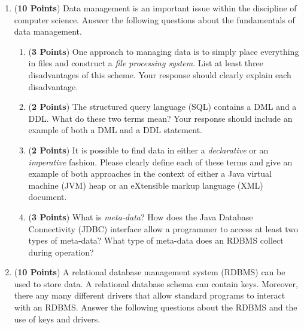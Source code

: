\documentclass[12pt]{article}
\begin{document}
\begin{enumerate}

\item ({\bf 10 Points}) Data management is an important issue within
  the discipline of computer science.  Answer the following questions
  about the fundamentals of data management.

\begin{enumerate}

\item ({\bf 3 Points}) One approach to managing data is to simply
  place everything in files and construct a {\em file processing
    system}.  List at least three disadvantages of this scheme.  Your
  response should clearly explain each disadvantage.

\item ({\bf 2 Points}) The structured query language (SQL) contains a
  DML and a DDL.  What do these two terms mean?  Your response should
  include an example of both a DML and a DDL statement.

\item ({\bf 2 Points}) It is possible to find data in either a {\em
  declarative} or an {\em imperative} fashion.  Please clearly define
  each of these terms and give an example of both approaches in the
  context of either a Java virtual machine (JVM) heap or an eXtensible
  markup language (XML) document.


\item ({\bf 3 Points}) What is {\em meta-data}?  How does the Java Database Connectivity (JDBC) interface allow a
  programmer to access at least two types of meta-data? What type of meta-data does an RDBMS collect during operation?

\end{enumerate}

\newpage

\item ({\bf 10 Points}) A relational database management system
  (RDBMS) can be used to store data.  A relational database schema can
  contain keys.  Moreover, there any many different drivers that allow
  standard programs to interact with an RDBMS.  Answer the following
  questions about the RDBMS and the use of keys and drivers.


\end{enumerate}
\end{document}
